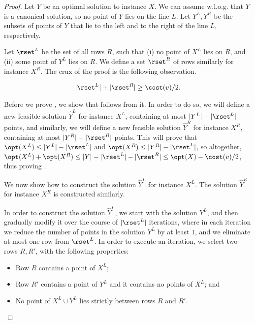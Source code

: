 \begin{proof}{}
	Let $Y$ be an optimal solution to instance $X$. We can assume w.l.o.g. that $Y$ is a canonical solution, so no point of $Y$ lies on the line $L$. Let $Y^L,Y^R$ be the subsets of points of $Y$ that lie to the left and to the right of the line $L$, respectively.
	
Let $\rset^L$ be the set of all rows $R$, such that (i) no point of $X^L$ lies on $R$, and (ii) some point of $Y^L$ lies on $R$. We define a set $\rset^R$ of rows similarly for instance $X^R$. The crux of the proof is the following observation.

\begin{myobs}\label{obs number of inactive rows with points}
\[	|\rset^L|+|\rset^R|\geq \cost(v)/2.\]
\end{myobs}

Before we	prove , we show that  follows from it. In order to do so, we will define a new feasible solution $\hat Y^L$ for instance $X^L$, containing at most $|Y^L|-|\rset^L|$ points, and similarly, we will define a new feasible solution $\hat Y^R$ for instance $X^R$, containing at most $|Y^R|-|\rset^R|$ points. This will prove that $\opt(X^L)\leq |Y^L|-|\rset^L|$ and $\opt(X^R)\leq |Y^R|-|\rset^L|$, so altogether, $\opt(X^L)+\opt(X^R) \leq |Y|-|\rset^L|-|\rset^R|\leq \opt(X)-\cost(v)/2$, thus proving .

We now show how to construct the solution $\hat Y^L$ for instance $X^L$. The solution $\hat Y^R$ for instance $X^R$ is constructed similarly.

In order to construct the solution $\hat Y^L$, we start with the solution $Y^L$, and then gradually modify it over the course of $|\rset^L|$ iterations, where in each iteration we reduce the number of points in the solution $Y^L$ by at least $1$, and we eliminate at most one row from $\rset^L$. In order to execute an iteration, we select two rows $R,R'$, with the following properties:

\begin{itemize}
	\item Row $R$ contains a point of $X^L$;
	\item Row $R'$ contains a point of $Y^L$ and it contains no points of $X^L$; and
	\item No point of $X^L\cup Y^L$ lies strictly between  rows $R$ and $R'$.
\end{itemize}


\end{proof}
